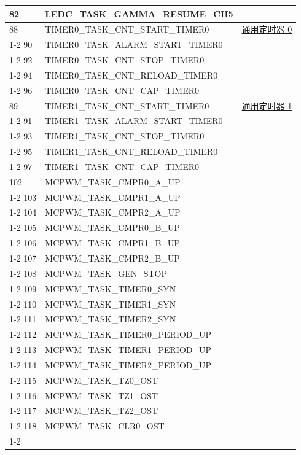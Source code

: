 \documentclass[main\_\_CN.tex]{subfiles}
\begin{document}
\begin{longtable}{ | l | l | l | }
82  & LEDC\_TASK\_GAMMA\_RESUME\_CH5& \\ \hline
88  & TIMER0\_TASK\_CNT\_START\_TIMER0     & \hyperref[mod:timg]{通用定时器 0}\\ \cline{1-2}
90  & TIMER0\_TASK\_ALARM\_START\_TIMER0   & \\ \cline{1-2}
92  & TIMER0\_TASK\_CNT\_STOP\_TIMER0      & \\ \cline{1-2}
94  & TIMER0\_TASK\_CNT\_RELOAD\_TIMER0    & \\ \cline{1-2}
96  & TIMER0\_TASK\_CNT\_CAP\_TIMER0& \\ \hline
89  & TIMER1\_TASK\_CNT\_START\_TIMER0     & \hyperref[mod:timg]{通用定时器 1}\\ \cline{1-2}
91  & TIMER1\_TASK\_ALARM\_START\_TIMER0   & \\ \cline{1-2}
93  & TIMER1\_TASK\_CNT\_STOP\_TIMER0      & \\ \cline{1-2}
95  & TIMER1\_TASK\_CNT\_RELOAD\_TIMER0    & \\ \cline{1-2}
97  & TIMER1\_TASK\_CNT\_CAP\_TIMER0& \\ \hline
102 & MCPWM\_TASK\_CMPR0\_A\_UP& \nameref{mod:mcpwm}\\ \cline{1-2}
103 & MCPWM\_TASK\_CMPR1\_A\_UP& \\ \cline{1-2}
104 & MCPWM\_TASK\_CMPR2\_A\_UP& \\ \cline{1-2}
105 & MCPWM\_TASK\_CMPR0\_B\_UP& \\ \cline{1-2}
106 & MCPWM\_TASK\_CMPR1\_B\_UP& \\ \cline{1-2}
107 & MCPWM\_TASK\_CMPR2\_B\_UP& \\ \cline{1-2}
108 & MCPWM\_TASK\_GEN\_STOP & \\ \cline{1-2}
109 & MCPWM\_TASK\_TIMER0\_SYN & \\ \cline{1-2}
110 & MCPWM\_TASK\_TIMER1\_SYN & \\ \cline{1-2}
111 & MCPWM\_TASK\_TIMER2\_SYN & \\ \cline{1-2}
112 & MCPWM\_TASK\_TIMER0\_PERIOD\_UP      & \\ \cline{1-2}
113 & MCPWM\_TASK\_TIMER1\_PERIOD\_UP      & \\ \cline{1-2}
114 & MCPWM\_TASK\_TIMER2\_PERIOD\_UP      & \\ \cline{1-2}
115 & MCPWM\_TASK\_TZ0\_OST  & \\ \cline{1-2}
116 & MCPWM\_TASK\_TZ1\_OST  & \\ \cline{1-2}
117 & MCPWM\_TASK\_TZ2\_OST  & \\ \cline{1-2}
118 & MCPWM\_TASK\_CLR0\_OST & \\ \cline{1-2}

\end{longtable}
\end{document}
